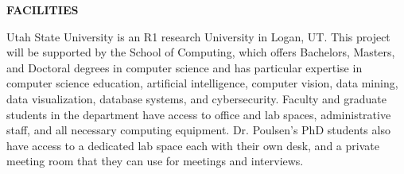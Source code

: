 \documentclass[12pt]{article}
\begin{document}
\textbf{FACILITIES}

Utah State University is an R1 research University in Logan, UT. This project will be supported by the School of Computing, which offers Bachelors, Masters, and Doctoral degrees in computer science and has particular expertise in computer science education, artificial intelligence, computer vision, data mining, data visualization, database systems, and cybersecurity. Faculty and graduate students in the department have access to office and lab spaces, administrative staff, and all necessary computing equipment. Dr. Poulsen's PhD students also have access to a dedicated lab space each with their own desk, and a private meeting room that they can use for meetings and interviews.
\end{document}
